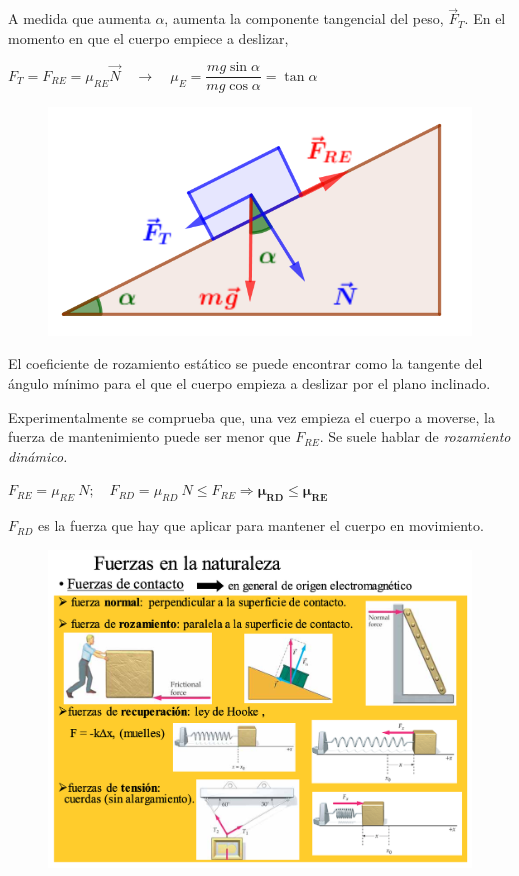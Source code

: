 \begin{multicols}{2}
A medida que aumenta $\alpha$, aumenta la componente tangencial del peso, $\vec F_T$. En el momento en que el cuerpo empiece a deslizar,

$F_T=F_{RE}=\mu_{RE}\vec N \quad \to \quad \mu_E=\dfrac {m g \sin \alpha}{m g \cos \alpha}=\tan \alpha$
\begin{figure}[H]
		\centering
		\includegraphics[width=.3\textwidth]{imagenes/imagenes03/T03IM49.png}
		\end{figure}		
\end{multicols}			
		

El coeficiente de rozamiento estático se puede encontrar como la tangente del ángulo mínimo para el que el cuerpo empieza a deslizar por el plano inclinado.

Experimentalmente se comprueba que, una vez empieza el cuerpo a moverse, la fuerza de mantenimiento puede ser menor que $F_{RE}$. Se suele hablar de \emph{rozamiento dinámico.}

$F_{RE}=\mu_{RE}\ N; \quad F_{RD}=\mu_{RD}\ N \le F_{RE} \Rightarrow \boldsymbol{\mu_{RD} \le \mu_{RE}}$		
		
$F_{RD}$ es la fuerza que hay que aplicar para mantener el cuerpo en movimiento.			


\begin{figure}[H]
		\centering
		\includegraphics[width=.75\textwidth]{imagenes/imagenes03/T03IM06.png}
		\end{figure}
		
\vspace{10mm} %
		
